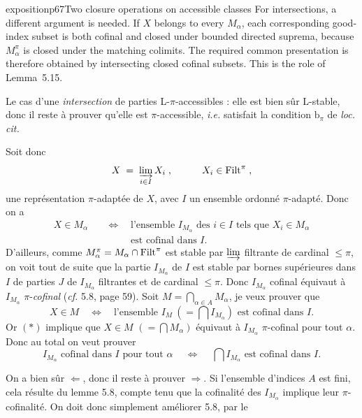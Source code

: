 \begin{dcomment}{exposition}{p67}{Two closure operations on accessible classes}
For intersections, a different argument is needed. If $X$ belongs to every $M_\alpha$, each corresponding good-index subset is both cofinal and closed under bounded directed suprema, because $M_\alpha^\pi$ is closed under the matching colimits. The required common presentation is therefore obtained by intersecting closed cofinal subsets. This is the role of Lemma~5.15.
\end{dcomment}


Le cas d'une \textit{intersection} de parties L-$\pi$-accessibles : elle est bien sûr L-stable, donc il reste à prouver qu'elle est $\pi$-accessible, \textit{i.e.} satisfait la condition $\mathrm{b}_{\pi}$ de \textit{loc. cit.}

Soit donc
\[
X \;=\; \varinjlim_{i\in I} X_{i} \; , \qquad\quad X_{i} \in \mathrm{Filt}^{\pi} \; ,
\]
une représentation $\pi$-adaptée de $X$, avec $I$ un ensemble ordonné $\pi$-adapté. Donc on a
\[
\begin{aligned}
X \in M_{\alpha} \quad &\Longleftrightarrow \quad \text{l'ensemble } I_{M_{\alpha}} \text{ des } i \in I \text{ tels que } X_{i} \in M_{\alpha}\\
&\phantom{\Longleftrightarrow} \quad \text{est cofinal dans } I.
\end{aligned}
\tag*{$(*)$}
\]
D'ailleurs, comme $M_{\alpha}^{\pi} = M_{\alpha} \cap \mathrm{Filt}^{\pi}$ est stable par $\varinjlim$ filtrante de cardinal $\leq \pi$, on voit tout de suite que la partie $I_{M_{\alpha}}$ de $I$ est stable par bornes supérieures dans $I$ de parties $J$ de $I_{M_{\alpha}}$ filtrantes et de cardinal $\leq \pi$. Donc $I_{M_{\alpha}}$ cofinal équivaut à $I_{M_{\alpha}}$ $\pi$-\textit{cofinal} (\textit{cf.} 5.8, page 59). Soit $M = \bigcap_{\alpha\in A} M_{\alpha}$, je veux prouver que
\[
X \in M \quad \Longleftrightarrow \quad \text{l'ensemble } I_{M} \ (= \textstyle\bigcap I_{M_{\alpha}}) \text{ est cofinal dans } I.
\tag*{$(**)$}
\]
Or $(*)$ implique que $X \in M$ $(= \bigcap M_{\alpha})$ équivaut à $I_{M_{\alpha}}$ $\pi$-cofinal pour tout $\alpha$. Donc au total on veut prouver
\[
I_{M_{\alpha}} \text{ cofinal dans } I \text{ pour tout } \alpha \quad\ \Longleftrightarrow \quad\ \textstyle\bigcap I_{M_{\alpha}} \text{ est cofinal dans } I.
\tag*{$(***)$}
\]

On a bien sûr $\Longleftarrow$, donc il reste à prouver $\Longrightarrow$. Si l'ensemble d'indices $A$ est fini, cela résulte du lemme 5.8, compte tenu que la cofinalité des $I_{M_{\alpha}}$ implique leur $\pi$-cofinalité. On doit donc simplement améliorer 5.8, par le

